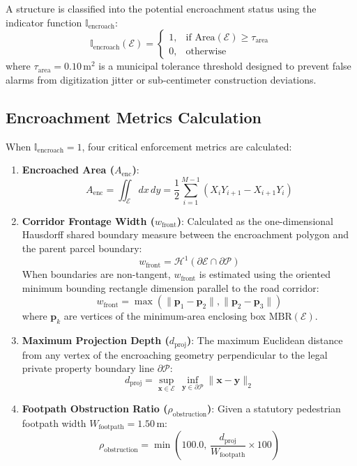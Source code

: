 \documentclass[conference]{IEEEtran}
\begin{document}
A structure is classified into the potential encroachment status using the indicator function $\mathbb{I}_{\text{encroach}}$:
\begin{equation}
\mathbb{I}_{\text{encroach}}(\mathcal{E}) = \begin{cases} 1, & \text{if } \text{Area}(\mathcal{E}) \ge \tau_{\text{area}} \\ 0, & \text{otherwise} \end{cases}
\end{equation}
where $\tau_{\text{area}} = 0.10\,\text{m}^2$ is a municipal tolerance threshold designed to prevent false alarms from digitization jitter or sub-centimeter construction deviations.

\subsection{Encroachment Metrics Calculation}
When $\mathbb{I}_{\text{encroach}} = 1$, four critical enforcement metrics are calculated:
\begin{enumerate}
    \item \textbf{Encroached Area ($A_{\text{enc}}$)}:
    \begin{equation}
    A_{\text{enc}} = \iint_{\mathcal{E}} dx \, dy = \frac{1}{2} \sum_{i=1}^{M-1} (X_i Y_{i+1} - X_{i+1} Y_i)
    \end{equation}
    \item \textbf{Corridor Frontage Width ($w_{\text{front}}$)}:
    Calculated as the one-dimensional Hausdorff shared boundary measure between the encroachment polygon and the parent parcel boundary:
    \begin{equation}
    w_{\text{front}} = \mathcal{H}^1(\partial \mathcal{E} \cap \partial \mathcal{P})
    \end{equation}
    When boundaries are non-tangent, $w_{\text{front}}$ is estimated using the oriented minimum bounding rectangle dimension parallel to the road corridor:
    \begin{equation}
    w_{\text{front}} = \max\left(\|\mathbf{p}_1 - \mathbf{p}_2\|, \|\mathbf{p}_2 - \mathbf{p}_3\|\right)
    \end{equation}
    where $\mathbf{p}_k$ are vertices of the minimum-area enclosing box $\text{MBR}(\mathcal{E})$.
    \item \textbf{Maximum Projection Depth ($d_{\text{proj}}$)}:
    The maximum Euclidean distance from any vertex of the encroaching geometry perpendicular to the legal private property boundary line $\partial \mathcal{P}$:
    \begin{equation}
    d_{\text{proj}} = \sup_{\mathbf{x} \in \mathcal{E}} \, \inf_{\mathbf{y} \in \partial \mathcal{P}} \|\mathbf{x} - \mathbf{y}\|_2
    \end{equation}
    \item \textbf{Footpath Obstruction Ratio ($\rho_{\text{obstruction}}$)}:
    Given a statutory pedestrian footpath width $W_{\text{footpath}} = 1.50\,\text{m}$:
    \begin{equation}
    \rho_{\text{obstruction}} = \min\left(100.0, \, \frac{d_{\text{proj}}}{W_{\text{footpath}}} \times 100\right)
    \end{equation}
\end{enumerate}
\end{document}
